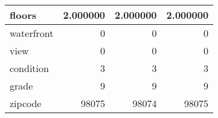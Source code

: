\begin{table}[H]
\begin{tabular}{|l|r|r|r|}
\hline floors & \cellcolor[rgb]{0.9, 0.54, 0.52} 2.000000 & \cellcolor[rgb]{0.9, 0.54, 0.52} 2.000000 & \cellcolor[rgb]{0.9, 0.54, 0.52} 2.000000 \\
\hline waterfront & \cellcolor[rgb]{0.9, 0.54, 0.52} 0 & \cellcolor[rgb]{0.9, 0.54, 0.52} 0 & \cellcolor[rgb]{0.9, 0.54, 0.52} 0 \\
\hline view & \cellcolor[rgb]{0.9, 0.54, 0.52} 0 & \cellcolor[rgb]{0.9, 0.54, 0.52} 0 & \cellcolor[rgb]{0.9, 0.54, 0.52} 0 \\
\hline condition & \cellcolor[rgb]{0.9, 0.54, 0.52} 3 & \cellcolor[rgb]{0.9, 0.54, 0.52} 3 & \cellcolor[rgb]{0.9, 0.54, 0.52} 3 \\
\hline grade & \cellcolor[rgb]{0.9, 0.54, 0.52} 9 & \cellcolor[rgb]{0.9, 0.54, 0.52} 9 & \cellcolor[rgb]{0.9, 0.54, 0.52} 9 \\
\hline zipcode & \cellcolor[rgb]{0.9, 0.54, 0.52} 98075 & 98074 & \cellcolor[rgb]{0.9, 0.54, 0.52} 98075 \\
\hline
\end{tabular}
\end{table}
